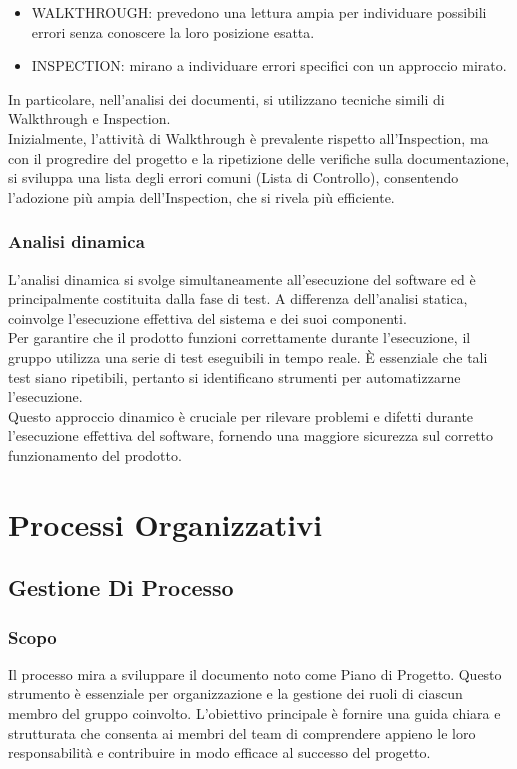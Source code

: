 \documentclass{article}
\begin{document}
    \begin{itemize}
    \item WALKTHROUGH: prevedono una lettura ampia per individuare possibili errori senza conoscere la loro posizione esatta.
    \item INSPECTION: mirano a individuare errori specifici con un approccio mirato.
    \end{itemize}
    In particolare, nell'analisi dei documenti, si utilizzano tecniche simili di Walkthrough e Inspection.\\
    Inizialmente, l'attività di Walkthrough è prevalente rispetto all'Inspection, ma con il progredire del progetto e la ripetizione delle verifiche sulla documentazione, si sviluppa una lista degli errori comuni (Lista di Controllo), consentendo l'adozione più ampia dell'Inspection, che si rivela più efficiente.
    \subsubsection{Analisi dinamica}
    L'analisi dinamica si svolge simultaneamente all'esecuzione del software ed è principalmente costituita dalla fase di test. A differenza dell'analisi statica, coinvolge l'esecuzione effettiva del sistema e dei suoi componenti.\\
    Per garantire che il prodotto funzioni correttamente durante l'esecuzione, il gruppo utilizza una serie di test eseguibili in tempo reale. È essenziale che tali test siano ripetibili, pertanto si identificano strumenti per automatizzarne l'esecuzione.\\
    Questo approccio dinamico è cruciale per rilevare problemi e difetti durante l'esecuzione effettiva del software, fornendo una maggiore sicurezza sul corretto funzionamento del prodotto.
    
\section{Processi Organizzativi}
\subsection{Gestione Di Processo}

\subsubsection{Scopo}
Il processo mira a sviluppare il documento noto come Piano di Progetto. Questo strumento è essenziale per organizzazione e la gestione dei ruoli di ciascun membro del gruppo coinvolto. L'obiettivo principale è fornire una guida chiara e strutturata che consenta ai membri del team di comprendere appieno le loro responsabilità e contribuire in modo efficace al successo del progetto.
\end{document}
